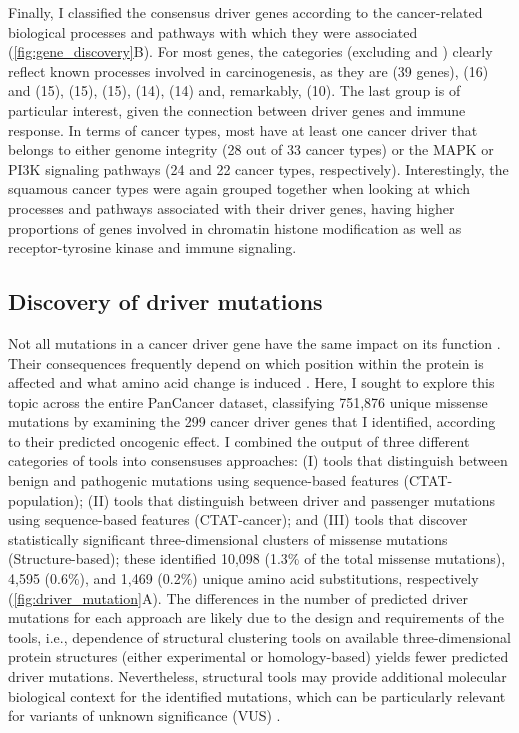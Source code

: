 Finally, I classified the consensus driver genes according to the cancer-related biological processes and pathways with which they were associated (\autoref{fig:gene_discovery}B). For most genes, the categories (excluding  and ) clearly reflect known processes involved in carcinogenesis, as they are  (39 genes),  (16) and  (15),  (15),  (15),  (14),  (14) and, remarkably,  (10). The last group is of particular interest, given the connection between driver genes and immune response. In terms of cancer types, most have at least one cancer driver that belongs to either genome integrity (28 out of 33 cancer types) or the MAPK or PI3K signaling pathways (24 and 22 cancer types, respectively). Interestingly, the squamous cancer types were again grouped together when looking at which processes and pathways associated with their driver genes, having higher proportions of genes involved in chromatin histone modification as well as receptor-tyrosine kinase and immune signaling. 

\subsection{Discovery of driver mutations}
Not all mutations in a cancer driver gene have the same impact on its function \cite{RN183}. Their consequences frequently depend on which position within the protein is affected and what amino acid change is induced \cite{RN29}. Here, I sought to explore this topic across the entire PanCancer dataset, classifying 751,876 unique missense mutations by examining the 299 cancer driver genes that I identified, according to their predicted oncogenic effect. I combined the output of three different categories of tools into consensuses approaches: (I) tools that distinguish between benign and pathogenic mutations using sequence-based features (CTAT-population); (II) tools that distinguish between driver and passenger mutations using sequence-based features (CTAT-cancer); and (III) tools that discover statistically significant three-dimensional clusters of missense mutations (Structure-based); these identified 10,098 (1.3\% of the total missense mutations), 4,595 (0.6\%), and 1,469 (0.2\%) unique amino acid substitutions, respectively (\autoref{fig:driver_mutation}A). The differences in the number of predicted driver mutations for each approach are likely due to the design and requirements of the tools, i.e., dependence of structural clustering tools on available three-dimensional protein structures (either experimental or homology-based) yields fewer predicted driver mutations. Nevertheless, structural tools may provide additional molecular biological context for the identified mutations, which can be particularly relevant for variants of unknown significance (VUS) \cite{RN184}.

